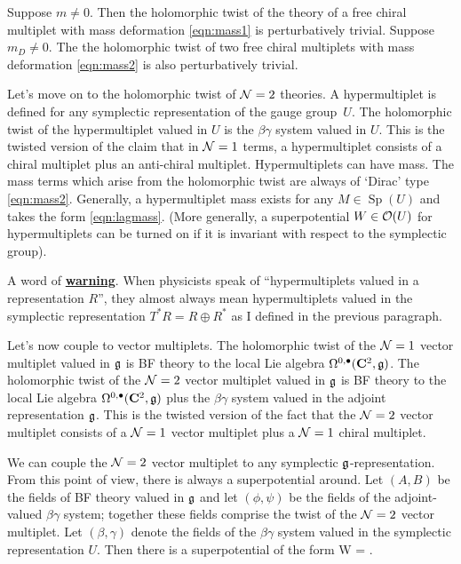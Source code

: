 \documentclass[11pt]{amsart}
\renewcommand{\op}{\operatorname}
\begin{document}
\begin{prop}
\label{prop:mass}
Suppose $m \ne 0$.
Then the holomorphic twist of the theory of a free chiral multiplet with mass deformation \eqref{eqn:mass1} is perturbatively trivial.
Suppose $m_D \ne 0$.
The the holomorphic twist of two free chiral multiplets with mass deformation \eqref{eqn:mass2} is also perturbatively trivial. 
\end{prop}

Let's move on to the holomorphic twist of $\mathcal N=2$ theories.
A hypermultiplet is defined for any symplectic representation of the gauge group~$U$.
The holomorphic twist of the hypermultiplet valued in $U$ is the $\beta\gamma$ system valued in $U$.
This is the twisted version of the claim that in $\mathcal N=1$ terms, a hypermultiplet consists of a chiral multiplet plus an anti-chiral multiplet.
Hypermultiplets can have mass.
The mass terms which arise from the holomorphic twist are always of `Dirac' type \eqref{eqn:mass2}.
Generally, a hypermultiplet mass exists for any $M \in \op{Sp}(U)$ and takes the form \eqref{eqn:lagmass}.
(More generally, a superpotential $W \in \mathcal O(U)$ for hypermultiplets can be turned on if it is invariant with respect to the symplectic group).

A word of \ul{\textbf{warning}}.
When physicists speak of ``hypermultiplets valued in a representation $R$'', they almost always mean hypermultiplets valued in the symplectic representation $T^* R = R \oplus R^*$ as I defined in the previous paragraph.

Let's now couple to vector multiplets.
The holomorphic twist of the $\mathcal N=1$ vector multiplet valued in $\mathfrak{g}$ is BF theory to the local Lie algebra $\Omega^{0,\bullet}(\mathbf{C}^2, \mathfrak{g})$.
The holomorphic twist of the $\mathcal N=2$ vector multiplet valued in $\mathfrak{g}$ is BF theory to the local Lie algebra $\Omega^{0,\bullet}(\mathbf{C}^2, \mathfrak{g})$ plus the $\beta\gamma$ system valued in the adjoint representation $\mathfrak{g}$.
This is the twisted version of the fact that the $\mathcal N=2$ vector multiplet consists of a $\mathcal N=1$ vector multiplet plus a $\mathcal N=1$ chiral multiplet.

We can couple the $\mathcal N=2$ vector multiplet to any symplectic $\mathfrak{g}$-representation.
From this point of view, there is always a superpotential around.
Let $(A,B)$ be the fields of BF theory valued in $\mathfrak{g}$ and let $(\phi ,\psi)$ be the fields of the adjoint-valued $\beta\gamma$ system; together these fields comprise the twist of the $\mathcal N=2$ vector multiplet.
Let $(\beta,\gamma)$ denote the fields of the $\beta\gamma$ system valued in the symplectic representation $U$.
Then there is a superpotential of the form
\beqn
W = \gamma \phi \gamma .
\eeqn
\end{document}
